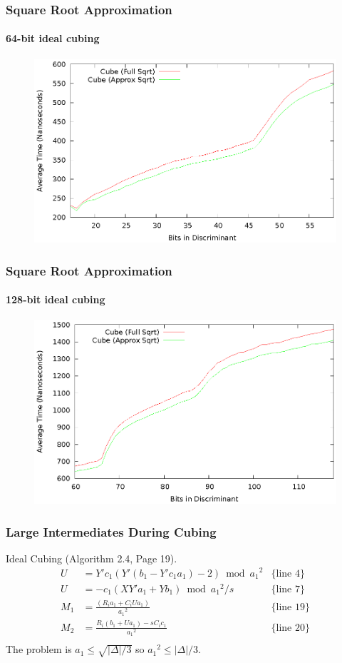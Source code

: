 \documentclass{beamer}
\begin{document}
\begin{frame}
\frametitle{Square Root Approximation}
\framesubtitle{64-bit ideal cubing}
\begin{figure}
\includegraphics[scale=0.86]{cube-sqrtopt-64}
\end{figure}
\end{frame}

\begin{frame}
\frametitle{Square Root Approximation}
\framesubtitle{128-bit ideal cubing}
\begin{figure}
\includegraphics[scale=0.86]{cube-sqrtopt-128}
\end{figure}
\end{frame}


\begin{frame}
\frametitle{Large Intermediates During Cubing}
Ideal Cubing (Algorithm 2.4, Page 19).
\begin{align*}
U &= Y'c_1(Y'(b_1 - Y'c_1a_1) - 2) \bmod {a_1}^2 & \textrm{\{line 4\}}\\
U &= -c_1(XY'a_1+Yb_1) \bmod {a_1}^2/s & \textrm{\{line 7\}} \\
M_1 &= \frac{(R_ia_1 + C_iUa_1)}{{a_1}^2} & \textrm{\{line 19\}} \\
M_2 &= \frac{R_i(b_1 + Ua_1) - sC_ic_1}{{a_1}^2} & \textrm{\{line 20\}} \\
\end{align*}
The problem is $a_1 \le \sqrt{|\Delta|/3}$ so ${a_1}^2 \le |\Delta|/3$.
\end{frame}
\end{document}
